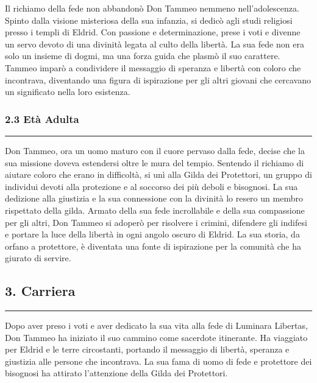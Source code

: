 Il richiamo della fede non abbandonò Don Tammeo nemmeno
nell'adolescenza. Spinto dalla visione misteriosa della sua infanzia, si
dedicò agli studi religiosi presso i templi di Eldrid. Con passione e
determinazione, prese i voti e divenne un servo devoto di una divinità
legata al culto della libertà. La sua fede non era solo un insieme di
dogmi, ma una forza guida che plasmò il suo carattere. Tammeo imparò a
condividere il messaggio di speranza e libertà con coloro che
incontrava, diventando una figura di ispirazione per gli altri giovani
che cercavano un significato nella loro esistenza.

\subsubsection{\texorpdfstring{2.3 \textbf{Età
Adulta}}{2.3 Età Adulta}}\label{etuxe0-adulta}

\begin{center}\rule{0.5\linewidth}{0.5pt}\end{center}

Don Tammeo, ora un uomo maturo con il cuore pervaso dalla fede, decise
che la sua missione doveva estendersi oltre le mura del tempio. Sentendo
il richiamo di aiutare coloro che erano in difficoltà, si unì alla Gilda
dei Protettori, un gruppo di individui devoti alla protezione e al
soccorso dei più deboli e bisognosi. La sua dedizione alla giustizia e
la sua connessione con la divinità lo resero un membro rispettato della
gilda. Armato della sua fede incrollabile e della sua compassione per
gli altri, Don Tammeo si adoperò per risolvere i crimini, difendere gli
indifesi e portare la luce della libertà in ogni angolo oscuro di
Eldrid. La sua storia, da orfano a protettore, è diventata una fonte di
ispirazione per la comunità che ha giurato di servire.

\subsection{3. Carriera}\label{carriera}

\begin{center}\rule{0.5\linewidth}{0.5pt}\end{center}

Dopo aver preso i voti e aver dedicato la sua vita alla fede di Luminara
Libertas, Don Tammeo ha iniziato il suo cammino come sacerdote
itinerante. Ha viaggiato per Eldrid e le terre circostanti, portando il
messaggio di libertà, speranza e giustizia alle persone che incontrava.
La sua fama di uomo di fede e protettore dei bisognosi ha attirato
l'attenzione della Gilda dei Protettori.

